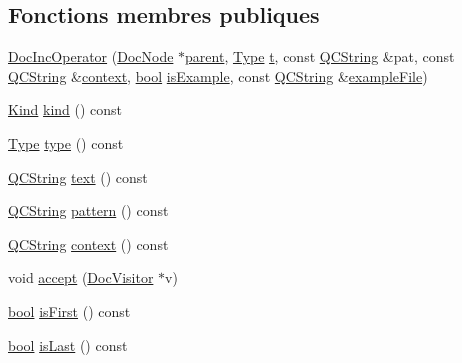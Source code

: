 \subsection*{Fonctions membres publiques}
\begin{DoxyCompactItemize}
\item 
\hyperlink{class_doc_inc_operator_a6211ce627975ce96c72df771d1b47828}{Doc\+Inc\+Operator} (\hyperlink{class_doc_node}{Doc\+Node} $\ast$\hyperlink{class_doc_node_a990d8b983962776a647e6231d38bd329}{parent}, \hyperlink{class_doc_inc_operator_ae7a155da5a206f51e93edc166bd64970}{Type} \hyperlink{058__bracket__recursion_8tcl_a69e959f6901827e4d8271aeaa5fba0fc}{t}, const \hyperlink{class_q_c_string}{Q\+C\+String} \&pat, const \hyperlink{class_q_c_string}{Q\+C\+String} \&\hyperlink{class_doc_inc_operator_a567858fa8735d5e0374cca65ab854625}{context}, \hyperlink{qglobal_8h_a1062901a7428fdd9c7f180f5e01ea056}{bool} \hyperlink{class_doc_inc_operator_a058c0006b89fbfbfc8096470881d73a8}{is\+Example}, const \hyperlink{class_q_c_string}{Q\+C\+String} \&\hyperlink{class_doc_inc_operator_a648025595293bbc829b9172e7cf2b4eb}{example\+File})
\item 
\hyperlink{class_doc_node_aebd16e89ca590d84cbd40543ea5faadb}{Kind} \hyperlink{class_doc_inc_operator_a6485c0b46a71b4f2a2743e7f51396473}{kind} () const 
\item 
\hyperlink{class_doc_inc_operator_ae7a155da5a206f51e93edc166bd64970}{Type} \hyperlink{class_doc_inc_operator_a9b735e6882b3aded1ca162ee236580cc}{type} () const 
\item 
\hyperlink{class_q_c_string}{Q\+C\+String} \hyperlink{class_doc_inc_operator_a4cbaeb6d27683680327489363277a805}{text} () const 
\item 
\hyperlink{class_q_c_string}{Q\+C\+String} \hyperlink{class_doc_inc_operator_ae7f62d827820b6de260e3b16845e3e7f}{pattern} () const 
\item 
\hyperlink{class_q_c_string}{Q\+C\+String} \hyperlink{class_doc_inc_operator_a567858fa8735d5e0374cca65ab854625}{context} () const 
\item 
void \hyperlink{class_doc_inc_operator_a04e255a29d4ab90b17f2ebc233fe288a}{accept} (\hyperlink{class_doc_visitor}{Doc\+Visitor} $\ast$v)
\item 
\hyperlink{qglobal_8h_a1062901a7428fdd9c7f180f5e01ea056}{bool} \hyperlink{class_doc_inc_operator_a35a1c68a8137aabf498301bb196f704d}{is\+First} () const 
\item 
\hyperlink{qglobal_8h_a1062901a7428fdd9c7f180f5e01ea056}{bool} \hyperlink{class_doc_inc_operator_ae9fb24c36a6a1f0fbcfe6560cf94c091}{is\+Last} () const 

\end{DoxyCompactItemize}
